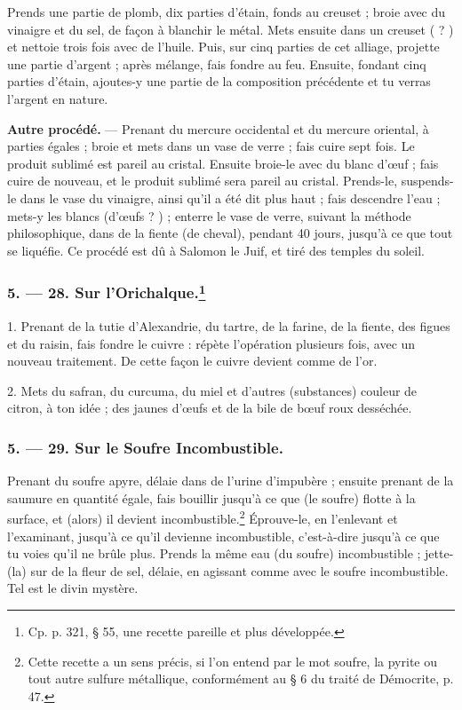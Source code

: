 \documentclass[a4paper, 11pt, oneside, polutonikogreek, french]{article}
\begin{document}
Prends une partie de plomb, dix parties d'étain, fonds au creuset ; broie avec du vinaigre et du sel, de façon à blanchir le métal. Mets ensuite dans un creuset ( ? ) et nettoie trois fois avec de l'huile. Puis, sur cinq parties de cet alliage, projette une partie d'argent ; après mélange, fais fondre au feu. Ensuite, fondant cinq parties d'étain, ajoutes-y une partie de la composition précédente et tu verras l'argent en nature.

\textbf{Autre procédé.} --- Prenant du mercure occidental et du mercure oriental, à parties égales ; broie et mets dans un vase de verre ; fais cuire sept fois. Le produit sublimé est pareil au cristal. Ensuite broie-le avec du blanc d'œuf ; fais cuire de nouveau, et le produit sublimé sera pareil au cristal. Prends-le, suspends-le dans le vase du vinaigre, ainsi qu'il a été dit plus haut ; fais descendre l'eau ; mets-y les blancs (d'œufs ? ) ; enterre le vase de verre, suivant la méthode philosophique, dans de la fiente (de cheval), pendant 40 jours, jusqu'à ce que tout se liquéfie. Ce procédé est dû à Salomon le Juif, et tiré des temples du soleil.

\bigskip
\centerline{\EightStarTaper}
\centerline{\EightStarTaper\EightStarTaper}
\bigskip

\subsubsection[5. --- 28. Sur l'Orichalque.]{5. --- 28. Sur l'Orichalque.\footnote{Cp. p. 321, § 55, une recette pareille et plus développée.}}

1. Prenant de la tutie d'Alexandrie, du tartre, de la farine, de la fiente, des figues et du raisin, fais fondre le cuivre : répète l'opération plusieurs fois, avec un nouveau traitement. De cette façon le cuivre devient comme de l'or.

2. Mets du safran, du curcuma, du miel et d'autres (substances) couleur de citron, à ton idée ; des jaunes d'œufs et de la bile de bœuf roux desséchée.

\bigskip
\centerline{\EightStarTaper}
\centerline{\EightStarTaper\EightStarTaper}
\bigskip

\subsubsection{5. --- 29. Sur le Soufre Incombustible.}

Prenant du soufre apyre, délaie dans de l'urine d'impubère ; ensuite prenant de la saumure en quantité égale, fais bouillir jusqu'à ce que (le soufre) flotte à la surface, et (alors) il devient incombustible.\footnote{Cette recette a un sens précis, si l'on entend par le mot soufre, la pyrite ou tout autre sulfure métallique, conformément au § 6 du traité de Démocrite, p. 47.} Éprouve-le, en l'enlevant et l'examinant, jusqu'à ce qu'il devienne incombustible, c'est-à-dire jusqu'à ce que tu voies qu'il ne brûle plus. Prends la même eau (du soufre) incombustible ; jette-(la) sur de la fleur de sel, délaie, en agissant comme avec le soufre incombustible. Tel est le divin mystère.
\end{document}
